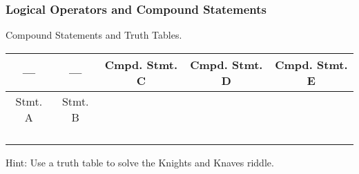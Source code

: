 \documentclass[fleqn]{beamer} %
\newcommand{\sectiontitleV}{Logical Operators and Compound Statements}
\begin{document}
	\begin{frame}[label=sectionV,containsverbatim] \small
	\frametitle{\sectiontitleV}    
	
	Compound Statements and Truth Tables.  \vspace{5mm}\\
	
	\renewcommand*{\arraystretch}{1.5}
	\begin{tabular}{|c|c|c|c|c|} \hline
		---&---& Cmpd. Stmt. C& Cmpd. Stmt. D& Cmpd. Stmt. E \\ \hline
		Stmt. A&Stmt. B& & & \\ \hline
		& & & & \\ \hline
		& & & & \\ \hline
		& & & & \\ \hline
		& & & & \\ \hline 
	
	\end{tabular}

	\vspace*{3mm}
	Hint: Use a truth table to solve the Knights and Knaves riddle.

	\end{frame}
\end{document}
